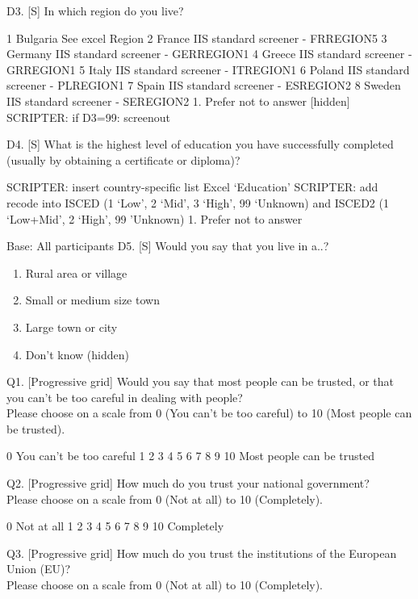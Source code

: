 \documentclass[
  12pt,
  a4paper,
]{article}
\providecommand{\tightlist}{%
  \setlength{\itemsep}{0pt}\setlength{\parskip}{0pt}}
\begin{document}
D3. {[}S{]} In which region do you live?

1 Bulgaria See excel Region
2 France IIS standard screener - FRREGION5
3 Germany IIS standard screener - GERREGION1
4 Greece IIS standard screener - GRREGION1
5 Italy IIS standard screener - ITREGION1
6 Poland IIS standard screener - PLREGION1
7 Spain IIS standard screener - ESREGION2
8 Sweden IIS standard screener - SEREGION2
1. Prefer not to answer {[}hidden{]}\\
SCRIPTER: if D3=99: screenout

D4. {[}S{]} What is the highest level of education you have successfully completed (usually by obtaining a certificate or diploma)?

SCRIPTER: insert country-specific list Excel `Education'
SCRIPTER: add recode into ISCED (1 `Low', 2 `Mid', 3 `High', 99 `Unknown) and ISCED2 (1 `Low+Mid', 2 `High', 99 'Unknown)
1. Prefer not to answer

Base: All participants
D5. {[}S{]} Would you say that you live in a..?

\begin{enumerate}
\def\labelenumi{\arabic{enumi}.}
\tightlist
\item
  Rural area or village\\
\item
  Small or medium size town\\
\item
  Large town or city\\
\item
  Don't know (hidden)
\end{enumerate}

Q1. {[}Progressive grid{]} Would you say that most people can be trusted, or that you can't be too careful in dealing with people?\\
Please choose on a scale from 0 (You can't be too careful) to 10 (Most people can be trusted).

0
You can't be too careful 1 2 3 4 5 6 7 8 9 10
Most people can be trusted

Q2. {[}Progressive grid{]} How much do you trust your national government?\\
Please choose on a scale from 0 (Not at all) to 10 (Completely).

0
Not at all 1 2 3 4 5 6 7 8 9 10
Completely

Q3. {[}Progressive grid{]} How much do you trust the institutions of the European Union (EU)?\\
Please choose on a scale from 0 (Not at all) to 10 (Completely).
\end{document}
